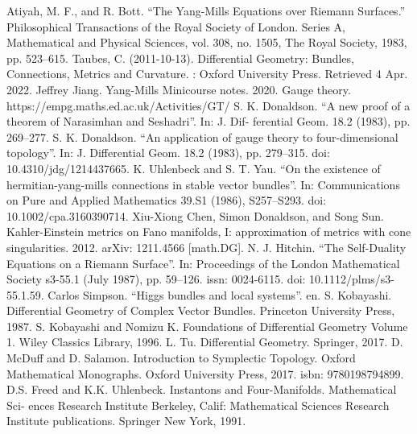 \documentclass[11pt]{amsart}
\numberwithin{equation}{section}
\theoremstyle{plain}
\theoremstyle{plain}
\numberwithin{equation}{section}
\begin{document}
\begin{thebibliography}{99}
\bibitem{}
Atiyah, M. F., and R. Bott. “The Yang-Mills Equations over Riemann Surfaces.” Philosophical Transactions of the Royal Society of London. Series A, Mathematical and Physical Sciences, vol. 308, no. 1505, The Royal Society, 1983, pp. 523–615.
\bibitem{}
Taubes, C. (2011-10-13). Differential Geometry: Bundles, Connections, Metrics and Curvature. : Oxford University Press. Retrieved 4 Apr. 2022.
\bibitem{}
Jeffrey Jiang. Yang-Mills Minicourse notes. 2020. 
\bibitem{}
Gauge theory. https://empg.maths.ed.ac.uk/Activities/GT/
\bibitem{}
S. K. Donaldson. “A new proof of a theorem of Narasimhan and Seshadri”. In: J. Dif- ferential Geom. 18.2 (1983), pp. 269–277.
\bibitem{}
S. K. Donaldson. “An application of gauge theory to four-dimensional topology”. In: J. Differential Geom. 18.2 (1983), pp. 279–315. doi: 10.4310/jdg/1214437665. 
\bibitem{}
K. Uhlenbeck and S. T. Yau. “On the existence of hermitian-yang-mills connections
in stable vector bundles”. In: Communications on Pure and Applied Mathematics 39.S1 (1986), S257–S293. doi: 10.1002/cpa.3160390714.
\bibitem{}
Xiu-Xiong Chen, Simon Donaldson, and Song Sun. Kahler-Einstein metrics on Fano manifolds, I: approximation of metrics with cone singularities. 2012. arXiv: 1211.4566 [math.DG].
\bibitem{}
N. J. Hitchin. “The Self-Duality Equations on a Riemann Surface”. In: Proceedings of the London Mathematical Society s3-55.1 (July 1987), pp. 59–126. issn: 0024-6115. doi: 10.1112/plms/s3-55.1.59.
\bibitem{}
Carlos Simpson. “Higgs bundles and local systems”. en.
\bibitem{}
S. Kobayashi. Differential Geometry of Complex Vector Bundles. Princeton University Press, 1987.
\bibitem{}
S. Kobayashi and Nomizu K. Foundations of Differential Geometry Volume 1. Wiley Classics Library, 1996.
\bibitem{}
L. Tu. Differential Geometry. Springer, 2017.
\bibitem{}
D. McDuff and D. Salamon. Introduction to Symplectic Topology. Oxford Mathematical Monographs. Oxford University Press, 2017. isbn: 9780198794899.
\bibitem{}
D.S. Freed and K.K. Uhlenbeck. Instantons and Four-Manifolds. Mathematical Sci- ences Research Institute Berkeley, Calif: Mathematical Sciences Research Institute publications. Springer New York, 1991.
\end{thebibliography}


\newpage
\end{document}
